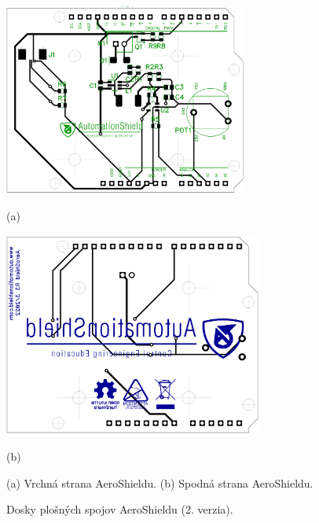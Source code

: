 \begin{figure}[!tbh]
	\centering
	\includegraphics[width=8cm]{obr/AeroShield3TOP.png}
	
	(a)
	
	\includegraphics[width=8.5cm]{obr/AeroShield3BOTTOM.png}
	
	(b)
	
	\caption{(a) Vrchná strana AeroShieldu. (b) Spodná strana AeroShieldu.}
	\label{OBRAZOK 2.4}
\end{figure}



\begin{figure}
	\hfill
	\hfill
	\hfill
	\caption{Dosky plošných spojov AeroShieldu (2. verzia).}\label{OBRAZOK 2.7}
\end{figure}

